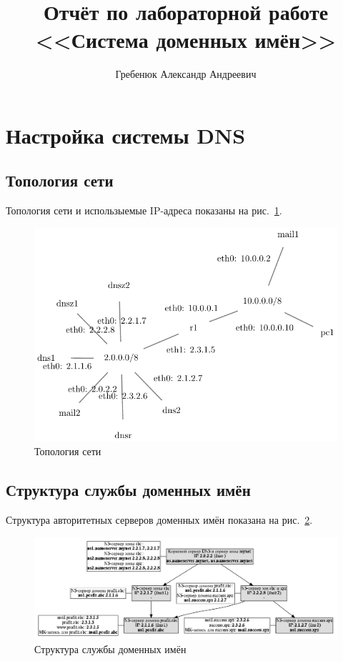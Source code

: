 \documentclass[a4paper,12pt]{article}
\title{Отчёт по лабораторной работе \\ <<Система доменных имён>>}
\author{Гребенюк Александр Андреевич}
\begin{document}
\maketitle

\clearpage
\tableofcontents

\clearpage
\section{Настройка системы DNS}

\subsection{Топология сети}

Топология сети и использыемые IP-адреса показаны на рис.~\ref{fig:network}.

\begin{figure}
\centering
\includegraphics[width=\textwidth]{includes/network_gv.pdf}
\caption{Топология сети}
\label{fig:network}
\end{figure}

\subsection{Структура службы доменных имён}

Структура авторитетных серверов доменных имён показана на рис.~\ref{fig:dns}.

\begin{figure}
\centering
\includegraphics[width=\textwidth]{includes/dns_gv.pdf}
\caption{Структура службы доменных имён}
\label{fig:dns}
\end{figure}
\end{document}
